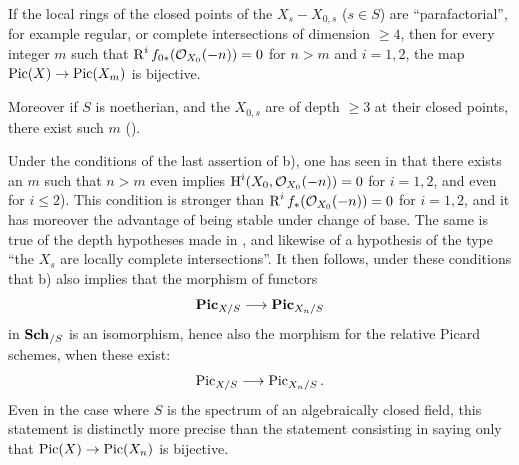 \begin{corollary}
\begin{enumeratea}
\item
If the local rings of the closed points of the $X_s- X_{0, s}$ ($s\in S$) are ``parafactorial'', for example regular, or complete intersections of dimension $\geq 4$, then for every integer $m$ such that $\operatorname{R}^if_{0\ast}({\mathcal O}_{X_0}(-n))=0$ for $n>m$ and $i=1, 2$, the map $\Pic(X)\to \Pic(X_m)$ is bijective.

Moreover if $S$ is noetherian, and the $X_{0, s}$ are of depth $\geq 3$ at their closed points, there exist such $m$ (\cf {}).
\end{enumeratea}
\end{corollary}

\begin{remark} \label{XII.4.10}
Under the conditions of the last assertion of  b), one has seen in  that there exists an $m$ such that $n>m$ even implies $\operatorname{H}^i(X_0, {\mathcal O}_{X_0}(-n))=0$ for $i=1, 2$, and even for $i\leq 2$). This condition is stronger than $\operatorname{R}^if_{\ast}({\mathcal O}_{X_0}(-n))=0$ for $i=1, 2$, and it has moreover the advantage of being stable under change of base. The same is true of the depth hypotheses made in , and likewise of a hypothesis of the type ``the $X_s$ are locally complete intersections''. It then follows, under these conditions that  b) also implies that the morphism of functors
\[
\SheafPic_{X/S}\to \SheafPic_{X_n/S}
\]
in $\operatorname{\mathbf{Sch}}_{/S}$ is an isomorphism, hence also the morphism for the relative Picard schemes, when these exist:
\[
\Pic_{X/S}\to \Pic_{X_n/S}.
\]
Even in the case where $S$ is the spectrum of an algebraically closed field, this statement is distinctly more precise than the statement consisting in saying only that $\Pic(X)\to \Pic(X_n)$ is bijective.


\end{remark}

